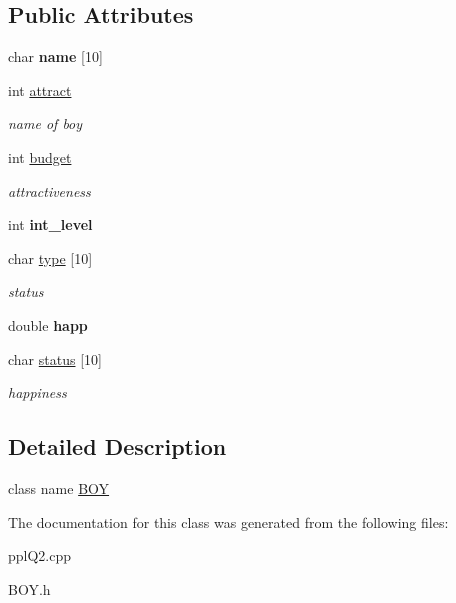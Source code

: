 \subsection*{Public Attributes}
\begin{DoxyCompactItemize}
\item 
\mbox{\label{classBOY_abf715bd190db0239dd44791d53458b34}} 
char {\bfseries name} \mbox{[}10\mbox{]}
\item 
\mbox{\label{classBOY_ae0412607bcd68ca79cb0eb4715f1a9bc}} 
int \hyperlink{classBOY_ae0412607bcd68ca79cb0eb4715f1a9bc}{attract}
\begin{DoxyCompactList}\small\item\em name of boy \end{DoxyCompactList}\item 
\mbox{\label{classBOY_a0b17a61e6d1c032b638cef05192a2a38}} 
int \hyperlink{classBOY_a0b17a61e6d1c032b638cef05192a2a38}{budget}
\begin{DoxyCompactList}\small\item\em attractiveness \end{DoxyCompactList}\item 
\mbox{\label{classBOY_afbb490388a031bea3e62c561d03ee525}} 
int {\bfseries int\+\_\+level}
\item 
\mbox{\label{classBOY_aca986517df0bc12d682203faae7bc59f}} 
char \hyperlink{classBOY_aca986517df0bc12d682203faae7bc59f}{type} \mbox{[}10\mbox{]}
\begin{DoxyCompactList}\small\item\em status \end{DoxyCompactList}\item 
\mbox{\label{classBOY_a3b7d109c795e1cf488166b7436411586}} 
double {\bfseries happ}
\item 
\mbox{\label{classBOY_a3060f1f55150949d15a3889e49fda6b3}} 
char \hyperlink{classBOY_a3060f1f55150949d15a3889e49fda6b3}{status} \mbox{[}10\mbox{]}
\begin{DoxyCompactList}\small\item\em happiness \end{DoxyCompactList}\end{DoxyCompactItemize}


\subsection{Detailed Description}
class name \hyperlink{classBOY}{B\+OY} 

The documentation for this class was generated from the following files\+:\begin{DoxyCompactItemize}
\item 
ppl\+Q2.\+cpp\item 
B\+O\+Y.\+h\end{DoxyCompactItemize}
